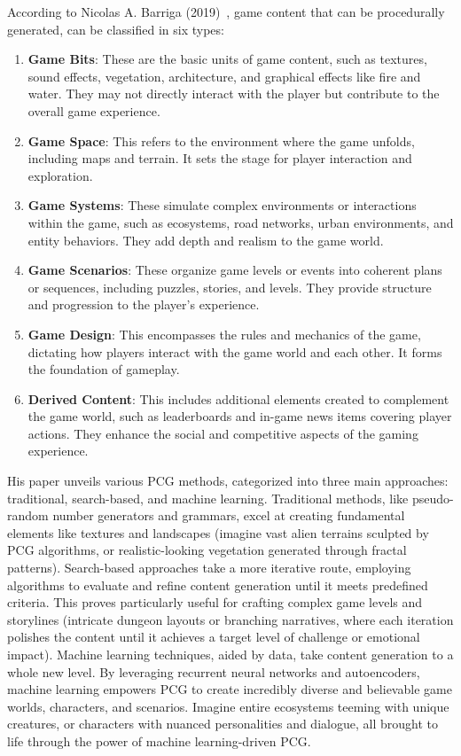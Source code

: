 \documentclass[runningheads]{llncs}
\begin{document}
According to Nicolas A. Barriga (2019)~\cite{ref_article3}, game content that can be procedurally generated, can be classified in six types:
\begin{enumerate}
\item \textbf{Game Bits}: These are the basic units of game content, such as textures, sound effects, vegetation, architecture, and graphical effects like fire and water. They may not directly interact with the player but contribute to the overall game experience.
\item \textbf{Game Space}: This refers to the environment where the game unfolds, including maps and terrain. It sets the stage for player interaction and exploration.
\item \textbf{Game Systems}: These simulate complex environments or interactions within the game, such as ecosystems, road networks, urban environments, and entity behaviors. They add depth and realism to the game world.
\item \textbf{Game Scenarios}: These organize game levels or events into coherent plans or sequences, including puzzles, stories, and levels. They provide structure and progression to the player's experience.
\item \textbf{Game Design}: This encompasses the rules and mechanics of the game, dictating how players interact with the game world and each other. It forms the foundation of gameplay.
\item \textbf{Derived Content}: This includes additional elements created to complement the game world, such as leaderboards and in-game news items covering player actions. They enhance the social and competitive aspects of the gaming experience.
\end{enumerate}

His paper unveils various PCG methods, categorized into three main approaches: traditional, search-based, and machine learning. Traditional methods, like pseudo-random number generators and grammars, excel at creating fundamental elements like textures and landscapes (imagine vast alien terrains sculpted by PCG algorithms, or realistic-looking vegetation generated through fractal patterns). Search-based approaches take a more iterative route, employing algorithms to evaluate and refine content generation until it meets predefined criteria. This proves particularly useful for crafting complex game levels and storylines (intricate dungeon layouts or branching narratives, where each iteration polishes the content until it achieves a target level of challenge or emotional impact). Machine learning techniques, aided by data, take content generation to a whole new level. By leveraging recurrent neural networks and autoencoders, machine learning empowers PCG to create incredibly diverse and believable game worlds, characters, and scenarios. Imagine entire ecosystems teeming with unique creatures, or characters with nuanced personalities and dialogue, all brought to life through the power of machine learning-driven PCG.
\end{document}
